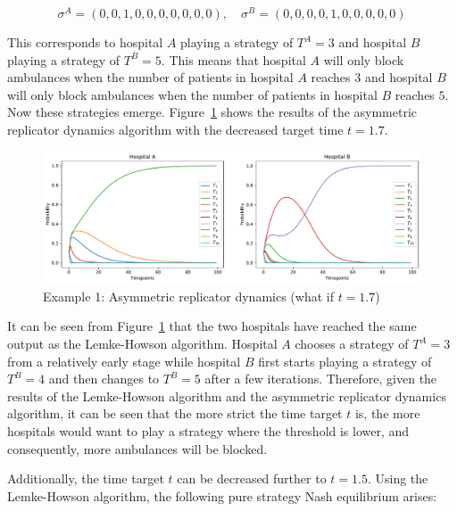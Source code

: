 \begin{equation}
    \sigma^A = (0, 0, 1, 0, 0, 0, 0, 0, 0, 0), \quad
    \sigma^B = (0, 0, 0, 0, 1, 0, 0, 0, 0, 0)
\end{equation}

This corresponds to hospital \(A\) playing a strategy of \(T^A = 3\) and
hospital \(B\) playing a strategy of \(T^B = 5\).
This means that hospital \(A\) will only block ambulances when the number of
patients in hospital \(A\) reaches \(3\) and hospital \(B\) will only block
ambulances when the number of patients in hospital \(B\) reaches \(5\).
Now 
these strategies emerge.
Figure~\ref{fig:asymmetric_replicator_dynamics_example_1_what_if_1} shows the
results of the asymmetric replicator dynamics algorithm with the decreased
target time \(t = 1.7\).

\begin{figure}[H]
    \centering
    \includegraphics[width=\linewidth]{chapters/05_numerical_results/Bin/example_1/what_if_t_1.7.pdf}
    \caption{Example 1: Asymmetric replicator dynamics (what if \(t = 1.7\))}
    \label{fig:asymmetric_replicator_dynamics_example_1_what_if_1}
\end{figure}

It can be seen from
Figure~\ref{fig:asymmetric_replicator_dynamics_example_1_what_if_1} that the
two hospitals have reached the same output as the Lemke-Howson algorithm.
Hospital \(A\) chooses a strategy of \(T^A=3\) from a relatively early stage
while hospital \(B\) first starts playing a strategy of \(T^B=4\) and then
changes to \(T^B=5\) after a few iterations.
Therefore, given the results of the Lemke-Howson algorithm and the asymmetric
replicator dynamics algorithm, it can be seen that the more strict the time
target \(t\) is, the more hospitals would want to play a strategy where the
threshold is lower, and consequently, more ambulances will be blocked.

Additionally, the time target \(t\) can be decreased further to \(t = 1.5\).
Using the Lemke-Howson algorithm, the following pure strategy Nash equilibrium
arises:

